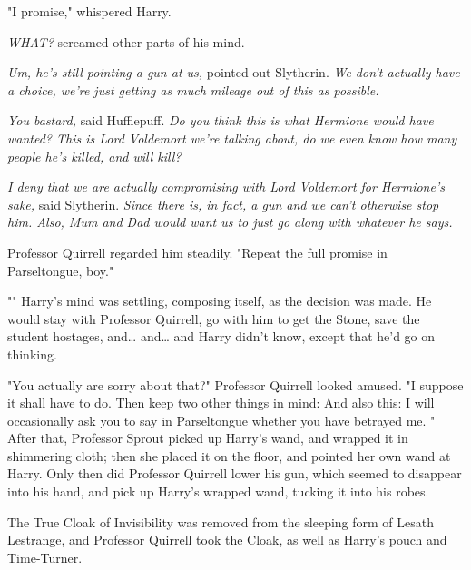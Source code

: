 "I promise," whispered Harry.

\emph{WHAT?} screamed other parts of his mind.

\emph{Um, he's still pointing a gun at us,} pointed out Slytherin. \emph{We 
don't actually have a choice, we're just getting as much mileage out of this as 
possible.}

\emph{You bastard,} said Hufflepuff. \emph{Do you think this is what Hermione 
would have wanted? This is Lord Voldemort we're talking about, do we even know 
how many people he's killed, and will kill?}

\emph{I deny that we are actually compromising with Lord Voldemort for 
Hermione's sake,} said Slytherin. \emph{Since there is, in fact, a gun and we 
can't otherwise stop him. Also, Mum and Dad would want us to just go along with 
whatever he says.}

Professor Quirrell regarded him steadily. "Repeat the full promise in 
Parseltongue, boy."

"" Harry's mind was settling, composing 
itself, as the decision was made. He would stay with Professor Quirrell, go 
with him to get the Stone, save the student hostages, and{\ldots} and{\ldots} 
and Harry didn't know, except that he'd go on thinking.

"You actually are sorry about that?" Professor Quirrell looked amused. "I 
suppose it shall have to do. Then keep two other things in mind:  And also this: I 
will occasionally ask you to say in Parseltongue whether you have betrayed me. 
"
\sbreak
After that, Professor Sprout picked up Harry's wand, and wrapped it in 
shimmering cloth; then she placed it on the floor, and pointed her own wand at 
Harry. Only then did Professor Quirrell lower his gun, which seemed to 
disappear into his hand, and pick up Harry's wrapped wand, tucking it into his 
robes.

The True Cloak of Invisibility was removed from the sleeping form of Lesath 
Lestrange, and Professor Quirrell took the Cloak, as well as Harry's pouch and 
Time-Turner.

